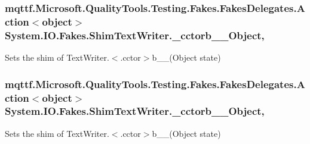 \hypertarget{class_system_1_1_i_o_1_1_fakes_1_1_shim_text_writer_a6d500c175f1d59bf2ea2c39eb735bab7}{
\subsubsection[{\-\_\-cctorb\-\_\-\-\_\-2\-Object}]{\setlength{\rightskip}{0pt plus 5cm}mqttf.\-Microsoft.\-Quality\-Tools.\-Testing.\-Fakes.\-Fakes\-Delegates.\-Action$<$object$>$ System.\-I\-O.\-Fakes.\-Shim\-Text\-Writer.\-\_\-cctorb\-\_\-\-\_\-Object\hspace{0.3cm}{\ttfamily [static]}, {\ttfamily [set]}}}\label{class_system_1_1_i_o_1_1_fakes_1_1_shim_text_writer_a6d500c175f1d59bf2ea2c39eb735bab7}


Sets the shim of Text\-Writer.$<$.cctor$>$b\-\_\-\-\_(\-Object state)

\hypertarget{class_system_1_1_i_o_1_1_fakes_1_1_shim_text_writer_af8877eed3075952b3c10bbedc0420fee}{
\subsubsection[{\-\_\-cctorb\-\_\-\-\_\-3\-Object}]{\setlength{\rightskip}{0pt plus 5cm}mqttf.\-Microsoft.\-Quality\-Tools.\-Testing.\-Fakes.\-Fakes\-Delegates.\-Action$<$object$>$ System.\-I\-O.\-Fakes.\-Shim\-Text\-Writer.\-\_\-cctorb\-\_\-\-\_\-Object\hspace{0.3cm}{\ttfamily [static]}, {\ttfamily [set]}}}\label{class_system_1_1_i_o_1_1_fakes_1_1_shim_text_writer_af8877eed3075952b3c10bbedc0420fee}


Sets the shim of Text\-Writer.$<$.cctor$>$b\-\_\-\-\_(\-Object state)

